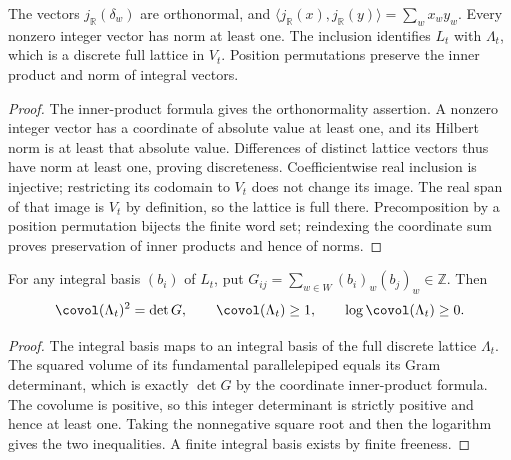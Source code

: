 \begin{lemma}
\label{lem:real-specht-lattice}
\leanok
The vectors $j_\mathbb R(\delta_w)$ are orthonormal, and
$\langle j_\mathbb R(x),j_\mathbb R(y)\rangle=\sum_w x_w y_w$.
Every nonzero integer vector has norm at least one. The inclusion
identifies $L_t$ with $\Lambda_t$, which is a discrete full lattice
in $V_t$. Position permutations preserve the inner product and norm
of integral vectors.
\end{lemma}
\begin{proof}
The inner-product formula gives the orthonormality assertion. A nonzero
integer vector has a coordinate of absolute value at least one, and
its Hilbert norm is at least that absolute value. Differences of distinct
lattice vectors thus have norm at least one, proving discreteness.
Coefficientwise real inclusion is injective; restricting its codomain
to $V_t$ does not change its image. The real span of that image is $V_t$
by definition, so the lattice is full there. Precomposition by a position
permutation bijects the finite word set; reindexing the coordinate sum
proves preservation of inner products and hence of norms.
\end{proof}

\begin{lemma}
\label{lem:integral-specht-covolume-nonneg}
\leanok
For any integral basis $(b_i)$ of $L_t$, put
$G_{ij}=\sum_{w\in W}(b_i)_w(b_j)_w\in\mathbb Z$. Then
\[
 \covol(\Lambda_t)^2=\det G,\qquad
 \covol(\Lambda_t)\geq1,\qquad \log\covol(\Lambda_t)\geq0.
\]
\end{lemma}
\begin{proof}
The integral basis maps to an integral basis of the full discrete
lattice $\Lambda_t$. The squared volume of its fundamental
parallelepiped equals its Gram determinant, which is exactly $\det G$
by the coordinate inner-product formula. The covolume is positive,
so this integer determinant is strictly positive and hence at least
one. Taking the nonnegative square root and then the logarithm gives
the two inequalities. A finite integral basis exists by finite freeness.
\end{proof}

